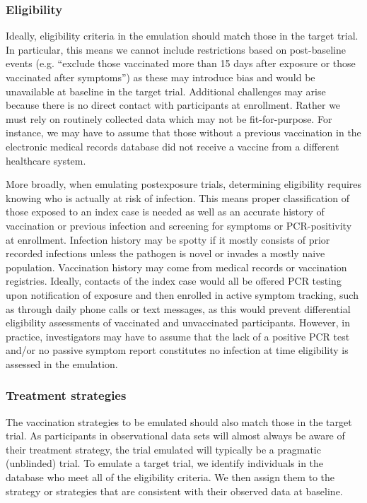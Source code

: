 \documentclass[11pt]{article}
\begin{document}
\subsubsection*{Eligibility}
Ideally, eligibility criteria in the emulation should match those in the target trial. In particular, this means we cannot include restrictions based on post-baseline events (e.g. ``exclude those vaccinated more than 15 days after exposure or those vaccinated after symptoms'') as these may introduce bias and would be unavailable at baseline in the target trial. Additional challenges may arise because there is no direct contact with participants at enrollment. Rather we must rely on routinely collected data which may not be fit-for-purpose. For instance, we may have to assume that those without a previous vaccination in the electronic medical records database did not receive a vaccine from a different healthcare system.

More broadly, when emulating postexposure trials, determining eligibility requires knowing who is actually at risk of infection. This means proper classification of those exposed to an index case is needed as well as an accurate history of vaccination or previous infection and screening for symptoms or PCR-positivity at enrollment. Infection history may be spotty if it mostly consists of prior recorded infections unless the pathogen is novel or invades a mostly naive population. Vaccination history may come from medical records or vaccination registries. Ideally, contacts of the index case would all be offered PCR testing upon notification of exposure and then enrolled in active symptom tracking, such as through daily phone calls or text messages, as this would prevent differential eligibility assessments of vaccinated and unvaccinated participants. However, in practice, investigators may have to assume that the lack of a positive PCR test and/or no passive symptom report constitutes no infection at time eligibility is assessed in the emulation.

\subsubsection*{Treatment strategies}
The vaccination strategies to be emulated should also match those in the target trial. As participants in observational data sets will almost always be aware of their treatment strategy, the trial emulated will typically be a pragmatic (unblinded) trial. To emulate a target trial, we identify individuals in the database who meet all of the eligibility criteria. We then assign them to the strategy or strategies that are consistent with their observed data at baseline.
\end{document}
